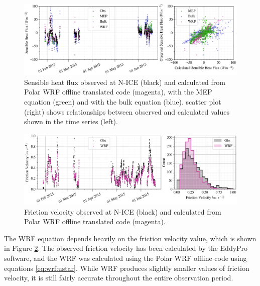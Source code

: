 \begin{figure}[t!]
    \centering
    \includegraphics[width=1\linewidth]{figures/chapter6/sensible_wrf.png}
    \caption[Sensible heat flux observed at N-ICE and calculated from Polar WRF offline translated code.]{Sensible heat flux observed at N-ICE (black) and calculated from Polar WRF offline translated code (magenta), with the MEP equation (green) and with the bulk equation (blue). scatter plot (right) shows relationships between observed and calculated values shown in the time series (left).}
    \label{fig:flux:sensible}
\end{figure}
\begin{figure}[b!]
    \centering
    \includegraphics[width=1\linewidth]{figures/chapter6/ustar_wrf.png}
    \caption[Friction velocity observed at N-ICE and calculated from Polar WRF offline translated code.]{Friction velocity observed at N-ICE (black) and calculated from Polar WRF offline translated code (magenta).}
    \label{fig:flux:ustar}
\end{figure}

The WRF equation depends heavily on the friction velocity value, which is shown in Figure \ref{fig:flux:ustar}. The observed friction velocity has been calculated by the EddyPro software, and the WRF was calculated using the Polar WRF offline code using equations \ref{eq:wrf:ustar}. While WRF produces slightly smaller values of friction velocity, it is still fairly accurate throughout the entire observation period. 

